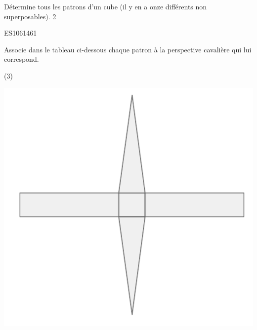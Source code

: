 \documentclass[a4paper,11pt]{report}
\begin{document}
\begin{exop}{
		Détermine tous les patrons d'un cube (il y en a onze différents non superposables).	
	}{2}
\end{exop}

\begin{exof}{ES106}{146}{1}
\end{exof}
\begin{exop}{
Associe dans le tableau ci-dessous chaque patron à la perspective cavalière qui lui correspond.

	\begin{tasks}(3)
		\task

	\includegraphics[scale=0.4]{media/es-20/pt217819}
		\task


\end{tasks}}
\end{exop}
\end{document}

